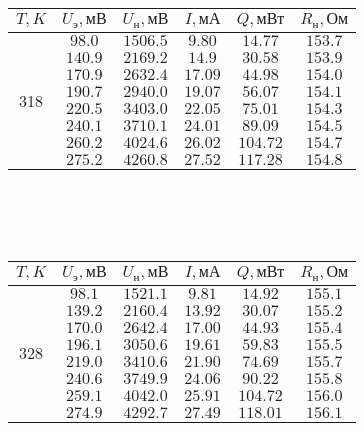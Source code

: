 \documentclass[20pt]{article}
\begin{document}
\begin{tabular}{|c|c|c|c|c|c|}
\hline $T, K$ & $U_\text{э}, \text{мВ}$ & $U_{\text{н}}, \text{мВ}$ & $I, \text{мА}$ & $Q, \text{мВт}$ & $R_{\text{н}}, \text{Ом}$ \\\hline
\multirow{8}{*}{318}
 & $98.0$ & $1506.5$ & $9.80$ & $14.77$ & $153.7$ \\\cline{2-6}
 & $140.9$ & $2169.2$ & $14.9$ & $30.58$ & $153.9$ \\\cline{2-6}
 & $170.9$ & $2632.4$ & $17.09$ & $44.98$ & $154.0$ \\\cline{2-6}
 & $190.7$ & $2940.0$ & $19.07$ & $56.07$ & $154.1$ \\\cline{2-6}
 & $220.5$ & $3403.0$ & $22.05$ & $75.01$ & $154.3$ \\\cline{2-6}
 & $240.1$ & $3710.1$ & $24.01$ & $89.09$ & $154.5$ \\\cline{2-6}
 & $260.2$ & $4024.6$ & $26.02$ & $104.72$ & $154.7$ \\\cline{2-6}
 & $275.2$ & $4260.8$ & $27.52$ & $117.28$ & $154.8$ \\\hline
\end{tabular} \\\\\\
\begin{tabular}{|c|c|c|c|c|c|}
\hline $T, K$ & $U_\text{э}, \text{мВ}$ & $U_{\text{н}}, \text{мВ}$ & $I, \text{мА}$ & $Q, \text{мВт}$ & $R_{\text{н}}, \text{Ом}$ \\\hline
\multirow{8}{*}{328}
 & $98.1$ & $1521.1$ & $9.81$ & $14.92$ & $155.1$ \\\cline{2-6}
 & $139.2$ & $2160.4$ & $13.92$ & $30.07$ & $155.2$ \\\cline{2-6}
 & $170.0$ & $2642.4$ & $17.00$ & $44.93$ & $155.4$ \\\cline{2-6}
 & $196.1$ & $3050.6$ & $19.61$ & $59.83$ & $155.5$ \\\cline{2-6}
 & $219.0$ & $3410.6$ & $21.90$ & $74.69$ & $155.7$ \\\cline{2-6}
 & $240.6$ & $3749.9$ & $24.06$ & $90.22$ & $155.8$ \\\cline{2-6}
 & $259.1$ & $4042.0$ & $25.91$ & $104.72$ & $156.0$ \\\cline{2-6}
 & $274.9$ & $4292.7$ & $27.49$ & $118.01$ & $156.1$ \\\hline
\end{tabular} \\\\\\
\end{document}

